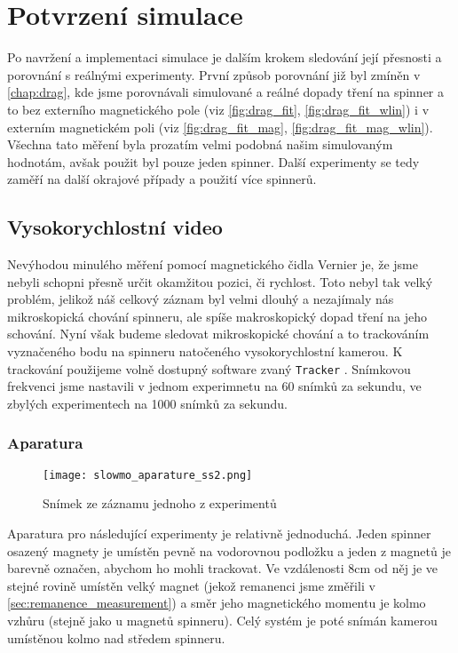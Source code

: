 \chapter{Potvrzení simulace}
\label{chap:sim_confirmation}

Po navržení a implementaci simulace je dalším krokem sledování její přesnosti a porovnání s reálnými experimenty. První způsob porovnání již byl zmíněn v \autoref{chap:drag}, kde jsme porovnávali simulované a reálné dopady tření na spinner a to bez externího magnetického pole (viz \autoref{fig:drag_fit}, \autoref{fig:drag_fit_wlin}) i v externím magnetickém poli (viz \autoref{fig:drag_fit_mag}, \autoref{fig:drag_fit_mag_wlin}). Všechna tato měření byla prozatím velmi podobná našim simulovaným hodnotám, avšak použit byl pouze jeden spinner. Další experimenty se tedy zaměří na další okrajové případy a použití více spinnerů.

\section{Vysokorychlostní video}

Nevýhodou minulého měření pomocí magnetického čidla Vernier je, že jsme nebyli schopni přesně určit okamžitou pozici, či rychlost. Toto nebyl tak velký problém, jelikož náš celkový záznam byl velmi dlouhý a nezajímaly nás mikroskopická chování spinneru, ale spíše makroskopický dopad tření na jeho schování. Nyní však budeme sledovat mikroskopické chování a to trackováním vyznačeného bodu na spinneru natočeného vysokorychlostní kamerou. K trackování použijeme volně dostupný software zvaný \texttt{Tracker} \cite{Tracker}. Snímkovou frekvenci jsme nastavili v jednom experimnetu na 60 snímků za sekundu, ve zbylých experimentech na 1000 snímků za sekundu.

\subsection{Aparatura}

\begin{wrapfigure}{r}{0.40\textwidth}
    \texttt{[image: slowmo\_aparature\_ss2.png]}
    \centering
    \caption{Snímek ze záznamu jednoho z experimentů}
    \label{fig:slowmo_aparature_ss2}
\end{wrapfigure}

Aparatura pro následující experimenty je relativně jednoduchá. Jeden spinner osazený magnety je umístěn pevně na vodorovnou podložku a jeden z magnetů je barevně označen, abychom ho mohli trackovat. Ve vzdálenosti 8cm od něj je ve stejné rovině umístěn velký magnet (jekož remanenci jsme změřili v \autoref{sec:remanence_measurement}) a směr jeho magnetického momentu je kolmo vzhůru (stejně jako u magnetů spinneru). Celý systém je poté snímán kamerou umístěnou kolmo nad středem spinneru.

